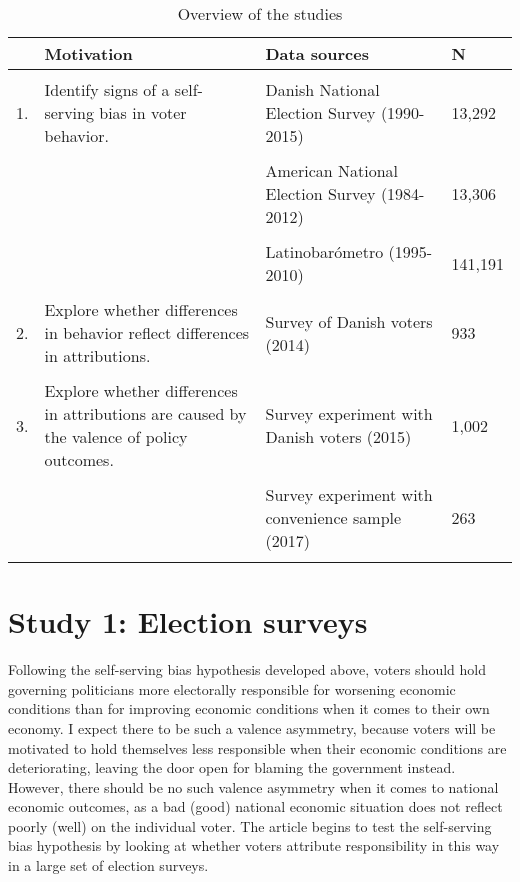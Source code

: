 \documentclass[a4paper,11pt]{article}
\begin{document}
	
	\begin{table}[htbp] \centering
		\caption{Overview of the studies} \label{overviewselfserv} \footnotesize
		\begin{tabular}{p{1mm}p{60mm}p{60mm}P{10mm}}  
			\hline 
			&Motivation&  Data sources& N \\ \hline  &&&\\ 
			1.& Identify signs of a self-serving bias in voter behavior.&  Danish National Election Survey \newline (1990-2015)& 13,292 \\  &&&\\
			&&  American National Election Survey \newline (1984-2012)& 13,306 \\  &&&\\
			&&  Latinobarómetro \newline (1995-2010)& 141,191 \\  &&&\\
			2.&Explore whether differences in behavior reflect differences in attributions.&  Survey of Danish voters \newline (2014)& 933 \\  &&&\\
			3.&Explore whether differences in attributions are caused by the valence of policy outcomes. & Survey experiment with Danish voters \newline (2015)& 1,002 \\  &&&\\
			&& Survey experiment with convenience sample \newline (2017) & 263 \\  &&&\\
			\hline \hline
		\end{tabular}
	\end{table}
	
	
	
	\section{Study 1: Election surveys}
	
	Following the self-serving bias hypothesis developed above, voters should hold governing politicians more electorally responsible for worsening economic conditions than for improving economic conditions when it comes to their own economy. I expect there to be such a valence asymmetry, because voters will be motivated to hold themselves less responsible when their economic conditions are deteriorating, leaving the door open for blaming the government instead. However, there should be no such valence asymmetry when it comes to national economic outcomes, as a bad (good) national economic situation does not reflect poorly (well) on the individual voter. The article begins to test the self-serving bias hypothesis by looking at whether voters attribute responsibility in this way in a large set of election surveys.
	
\end{document}

